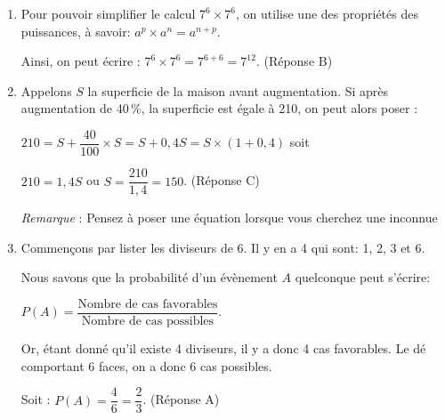 
\medskip

\begin{enumerate}
\item Pour pouvoir simplifier le calcul \:$7^6 \times 7^6$, on utilise une des propriétés des puissances, à savoir: $a^p \times  a^n = a^{n+p}$.

Ainsi, on peut écrire : $7^6 \times 7^6 = 7^{6+6} = 7^{12}$. (Réponse B)
\item Appelons $S$ la superficie de la maison avant augmentation. Si après augmentation de 40\,\%, la superficie est égale à 210, on peut alors poser :

$210 = S + \dfrac{40}{100} \times  S = S + 0,4S  = S \times  (1 + 0,4)$ soit 

$210 = 1,4S$ ou $S = \dfrac{210}{1,4} = 150$. (Réponse C)

\emph{Remarque} : Pensez à poser une équation lorsque vous cherchez une inconnue
\item Commençons par lister les diviseurs de 6. Il y en a 4 qui sont: 1, 2, 3 et 6.

Nous savons que la probabilité d'un évènement $A$ quelconque peut s'écrire:

$P(A) = \dfrac{\text{Nombre de cas favorables}}{\text{Nombre de cas possibles}}$.

Or, étant donné qu'il existe 4 diviseurs, il y a donc 4 cas favorables. Le dé comportant 6 faces, on a donc 6 cas possibles.

Soit : $P(A) = \dfrac{4}{6} = \dfrac{2}{3}$.  (Réponse A)
\end{enumerate}

\vspace{0,25cm}

